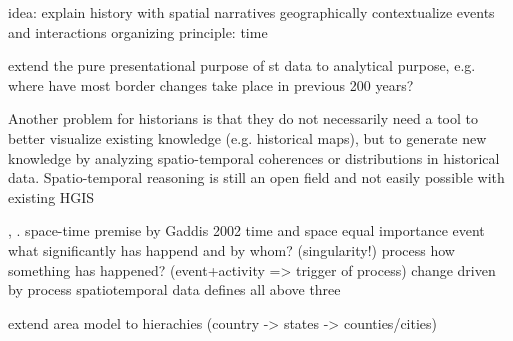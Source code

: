 idea: explain history with spatial narratives
  geographically contextualize events and interactions
  organizing principle: time

extend the pure presentational purpose of st data to analytical purpose, e.g. where have most border changes take place in previous 200 years?

Another problem for historians is that they do not necessarily need a tool to better visualize existing knowledge (e.g. historical maps), but to generate new knowledge by analyzing spatio-temporal coherences or distributions in historical data. Spatio-temporal reasoning is still an open field and not easily possible with existing HGIS

\cite[p. 268]{knowles2008placing}, \cite[p. xii]{gregory2014toward}.
space-time premise by Gaddis 2002
  time and space equal importance
  event     what significantly has happend and by whom? (singularity!)
  process   how something has happened? (event+activity => trigger of process)
  change    driven by process
  spatiotemporal data defines all above three

extend area model to hierachies (country -> states -> counties/cities)




